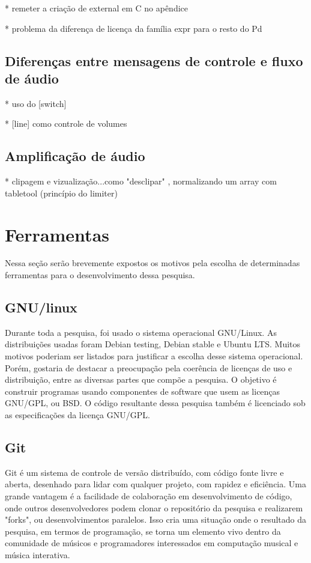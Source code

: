 \documentclass[draft]{ppgmus}
\begin{document}
* remeter a criação de external em C no apêndice

* problema da diferença de licença da família expr para o resto do Pd


\subsection{Diferenças entre mensagens de controle e fluxo de áudio}

* uso do [switch\texttildelow]

* [line\texttildelow] como controle de volumes


\subsection{Amplificação de áudio}

* clipagem e vizualização...como "desclipar" , normalizando um array com tabletool (princípio do limiter)

\section{Ferramentas}

Nessa seção serão brevemente expostos os motivos pela escolha de determinadas ferramentas para
o desenvolvimento dessa pesquisa.


\subsection{GNU/linux}

Durante toda a pesquisa, foi usado o sistema operacional GNU/Linux.
As distribuições usadas foram Debian testing, Debian stable e Ubuntu LTS.
Muitos motivos poderiam ser listados para justificar a escolha desse sistema
operacional. Porém, gostaria de destacar a preocupação pela coerência de licenças
de uso e distribuição, entre as diversas partes que compõe a pesquisa.
O objetivo é construir programas usando componentes de software que usem as licenças GNU/GPL, ou 
BSD. O código resultante dessa pesquisa também é licenciado sob as especificações
da licença GNU/GPL.



\subsection{Git}

Git é um sistema de controle de versão distribuído, com código fonte livre e aberta, desenhado para lidar com qualquer
projeto, com rapidez e eficiência.
Uma grande vantagem é a facilidade de colaboração em desenvolvimento de código, onde outros desenvolvedores
podem clonar o repositório da pesquisa e realizarem "forks", ou desenvolvimentos paralelos. Isso cria uma situação 
onde o resultado da pesquisa, em termos de programação, se torna um elemento vivo dentro da comunidade de músicos e 
programadores interessados em computação musical e música interativa.
\end{document}
